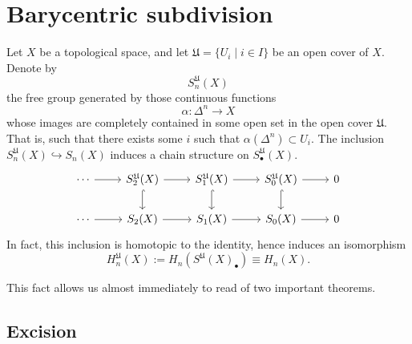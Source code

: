 \documentclass[main.tex]{subfiles}
\begin{document}
\section{Barycentric subdivision}
\label{sec:barycentric_subdivision}

\begin{fact}
  \label{fact:barycentric_subdivision}
  Let $X$ be a topological space, and let $\mathfrak{U} = \{U_{i} \mid i \in I\}$ be an open cover of $X$. Denote by
  \begin{equation*}
    S^{\mathfrak{U}}_{n}(X)
  \end{equation*}
  the free group generated by those continuous functions
  \begin{equation*}
    \alpha\colon \Delta^{n} \to X
  \end{equation*}
  whose images are completely contained in some open set in the open cover $\mathfrak{U}$. That is, such that there exists some $i$ such that $\alpha(\Delta^{n}) \subset U_{i}$. The inclusion $S^{\mathfrak{U}}_{n}(X) \hookrightarrow S_{n}(X)$ induces a chain structure on $S^{\mathfrak{U}}_{\bullet}(X)$.
  \begin{equation*}
    \begin{tikzcd}
      \cdots
      \arrow[r]
      & S^{\mathfrak{U}}_{2}(X)
      \arrow[r]
      \arrow[d, hook]
      & S^{\mathfrak{U}}_{1}(X)
      \arrow[r]
      \arrow[d, hook]
      & S^{\mathfrak{U}}_{0}(X)
      \arrow[r]
      \arrow[d, hook]
      & 0
      \\
      \cdots
      \arrow[r]
      & S_{2}(X)
      \arrow[r]
      & S_{1}(X)
      \arrow[r]
      & S_{0}(X)
      \arrow[r]
      & 0
    \end{tikzcd}
  \end{equation*}
  In fact, this inclusion is homotopic to the identity, hence induces an isomorphism
  \begin{equation*}
    H^{\mathfrak{U}}_{n}(X) := H_{n}(S^{\mathfrak{U}}(X)_{\bullet}) \equiv H_{n}(X).
  \end{equation*}
\end{fact}

This fact allows us almost immediately to read of two important theorems.

\subsection{Excision}
\label{ssc:excision}
\end{document}
